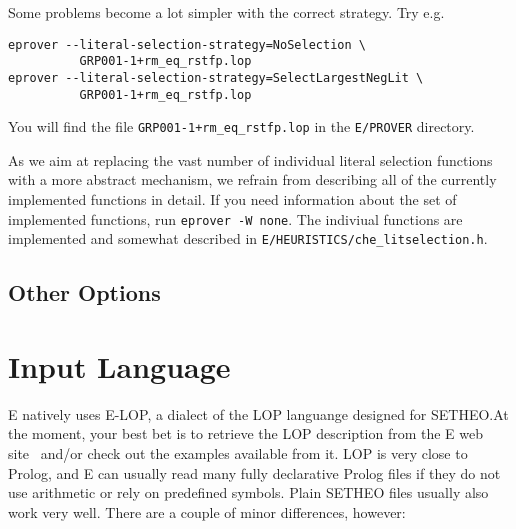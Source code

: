 \documentclass{article}
\begin{document}
\begin{example}
  Some problems become a lot simpler with the correct
  strategy. Try e.g.
\begin{verbatim}
eprover --literal-selection-strategy=NoSelection \
          GRP001-1+rm_eq_rstfp.lop
eprover --literal-selection-strategy=SelectLargestNegLit \
          GRP001-1+rm_eq_rstfp.lop
\end{verbatim}
  You will find the file \texttt{GRP001-1+rm\_eq\_rstfp.lop} in the
  \texttt{E/PROVER} directory.
\end{example}

As we aim at replacing the vast number of individual literal selection
functions with a more abstract mechanism, we refrain from describing
all of the currently implemented functions in detail. If you need
information about the set of implemented functions, run
\texttt{eprover -W none}. The indiviual functions are implemented and
somewhat described in \texttt{E/HEURISTICS/che\_litselection.h}.

\subsection{Other Options}
\label{sec:options:others}


\section{Input Language}
\label{sec:language}

E natively uses E-LOP, a dialect of the LOP languange designed for
SETHEO.At the moment, your best bet is to retrieve the LOP description
from the E web site~\cite{E:WWW-99} and/or check out the examples
available from it.  LOP is very close to Prolog, and E can usually
read many fully declarative Prolog files if they do not use arithmetic
or rely on predefined symbols. Plain SETHEO files usually also work
very well.  There are a couple of minor differences, however:
\end{document}
